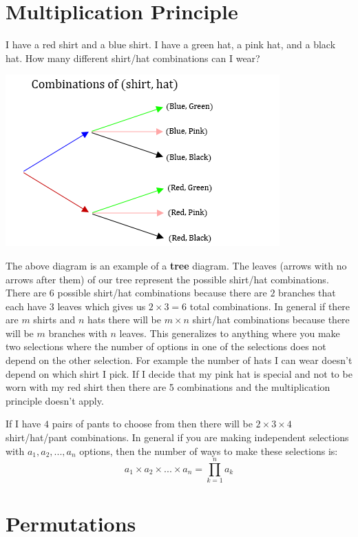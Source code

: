 \documentclass[
]{book}
\theoremstyle{definition}
\theoremstyle{definition}
\theoremstyle{definition}
\theoremstyle{remark}
\begin{document}
\hypertarget{multiplication-principle}{%
\section{Multiplication Principle}\label{multiplication-principle}}

I have a red shirt and a blue shirt. I have a green hat, a pink hat, and a black hat. How many different shirt/hat combinations can I wear?

\includegraphics{Pictures/02-Counting/Tree.PNG}

The above diagram is an example of a \textbf{tree} diagram. The leaves (arrows with no arrows after them) of our tree represent the possible shirt/hat combinations. There are \(6\) possible shirt/hat combinations because there are \(2\) branches that each have \(3\) leaves which gives us \(2 \times 3 = 6\) total combinations. In general if there are \(m\) shirts and \(n\) hats there will be \(m \times n\) shirt/hat combinations because there will be \(m\) branches with \(n\) leaves. This generalizes to anything where you make two selections where the number of options in one of the selections does not depend on the other selection. For example the number of hats I can wear doesn't depend on which shirt I pick. If I decide that my pink hat is special and not to be worn with my red shirt then there are 5 combinations and the multiplication principle doesn't apply.

If I have \(4\) pairs of pants to choose from then there will be \(2 \times 3 \times 4\) shirt/hat/pant combinations. In general if you are making independent selections with \(a_1,a_2,...,a_n\) options, then the number of ways to make these selections is:
\[a_1 \times a_2 \times ... \times a_n=\displaystyle\prod_{k=1}^{n} a_k\]

\hypertarget{permutations}{%
\section{Permutations}\label{permutations}}
\end{document}

